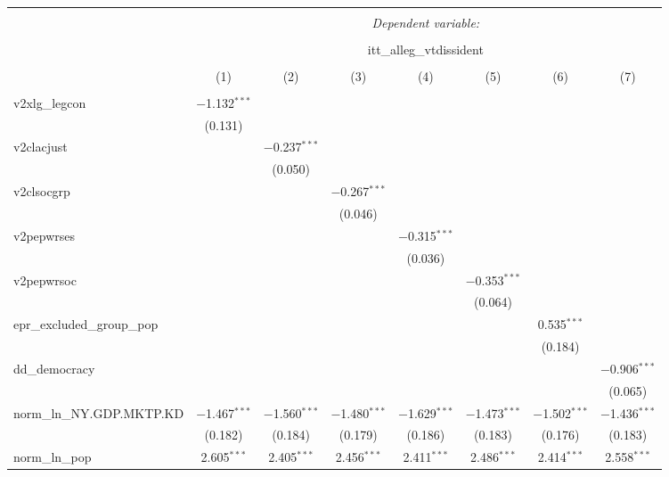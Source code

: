 
\begin{sidewaystable}[!htbp] \centering 
  \caption{} 
  \label{} 
\tiny 
\begin{tabular}{@{\extracolsep{5pt}}lccccccc} 
\\[-1.8ex]\hline 
\hline \\[-1.8ex] 
 & \multicolumn{7}{c}{\textit{Dependent variable:}} \\ 
\cline{2-8} 
\\[-1.8ex] & \multicolumn{7}{c}{itt\_alleg\_vtdissident} \\ 
\\[-1.8ex] & (1) & (2) & (3) & (4) & (5) & (6) & (7)\\ 
\hline \\[-1.8ex] 
 v2xlg\_legcon & $-$1.132$^{***}$ &  &  &  &  &  &  \\ 
  & (0.131) &  &  &  &  &  &  \\ 
  v2clacjust &  & $-$0.237$^{***}$ &  &  &  &  &  \\ 
  &  & (0.050) &  &  &  &  &  \\ 
  v2clsocgrp &  &  & $-$0.267$^{***}$ &  &  &  &  \\ 
  &  &  & (0.046) &  &  &  &  \\ 
  v2pepwrses &  &  &  & $-$0.315$^{***}$ &  &  &  \\ 
  &  &  &  & (0.036) &  &  &  \\ 
  v2pepwrsoc &  &  &  &  & $-$0.353$^{***}$ &  &  \\ 
  &  &  &  &  & (0.064) &  &  \\ 
  epr\_excluded\_group\_pop &  &  &  &  &  & 0.535$^{***}$ &  \\ 
  &  &  &  &  &  & (0.184) &  \\ 
  dd\_democracy &  &  &  &  &  &  & $-$0.906$^{***}$ \\ 
  &  &  &  &  &  &  & (0.065) \\ 
  norm\_ln\_NY.GDP.MKTP.KD & $-$1.467$^{***}$ & $-$1.560$^{***}$ & $-$1.480$^{***}$ & $-$1.629$^{***}$ & $-$1.473$^{***}$ & $-$1.502$^{***}$ & $-$1.436$^{***}$ \\ 
  & (0.182) & (0.184) & (0.179) & (0.186) & (0.183) & (0.176) & (0.183) \\ 
  norm\_ln\_pop & 2.605$^{***}$ & 2.405$^{***}$ & 2.456$^{***}$ & 2.411$^{***}$ & 2.486$^{***}$ & 2.414$^{***}$ & 2.558$^{***}$ \\ 

\end{tabular}
\end{sidewaystable}
